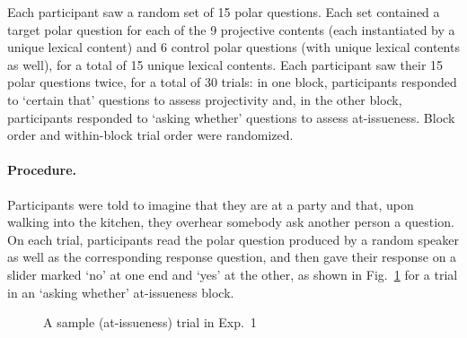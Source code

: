 \documentclass[11pt,fleqn]{article}
\newcommand{\6}{\mbox{$[\hspace*{-.6mm}[$}}
\newcommand{\9}{\mbox{$]\hspace*{-.6mm}]$}}
\newcommand{\figref}[1]{Fig.~\ref{#1}}
\begin{document}
Each participant saw a random set of 15 polar questions. Each set contained a target polar question for each of the 9 projective contents (each instantiated by a unique lexical content) and 6 control polar questions (with unique lexical contents as well), for a total of 15 unique lexical contents. Each participant saw their 15 polar questions twice, for a total of 30 trials: in one block, participants responded to `certain that' questions to assess projectivity and, in the other block, participants responded to `asking whether' questions to assess at-issueness. Block order and within-block trial order were randomized.



\paragraph{Procedure.} Participants were told to imagine that they are at a party and that, upon walking into the kitchen, they overhear somebody ask another person a question. On each trial, participants read the polar question produced by a random speaker as well as the corresponding response question, and then gave their response on a slider marked `no' at one end and `yes' at the other, as shown in \figref{f-trial-exp1} for a trial in an `asking whether' at-issueness block.  


\begin{figure}[h!]
\begin{center}
\end{center}
\caption{A sample (at-issueness) trial in Exp.~1}\label{f-trial-exp1}
\end{figure}
\end{document}
